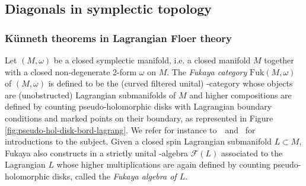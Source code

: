 \documentclass[twoside, 12pt]{amsart}
\theoremstyle{remark}
\begin{document}
\subsection{Diagonals in symplectic topology}

\subsubsection{K\"unneth theorems in Lagrangian Floer theory}

Let $(M,\omega)$ be a closed symplectic manifold, i.e. a closed manifold $M$ together with a closed non-degenerate 2-form $\omega$ on $M$. 
The \emph{Fukaya category} $\mathrm{Fuk}(M,\omega)$ of $(M,\omega)$  is defined to be the (curved filtered unital) \Ainf -category whose objects are (unobstructed) Lagrangian submanifolds of $M$ and higher compositions are defined by counting pseudo-holomorphic disks with Lagrangian boundary conditions and marked points on their boundary, as represented in Figure \ref{fig:pseudo-hol-disk-bord-lagrang}. 
We refer for instance to~\cite{smith-prolegomenon}~and~\cite{auroux-fukaya} for introductions to the subject.
Given a closed spin Lagrangian submanifold $L \subset M$, Fukaya also constructs in \cite{fukaya-cyclic-symmetry} a strictly unital \Ainf -algebra $\mathcal{F}(L)$ associated to the Lagrangian $L$ whose higher multiplications are again defined by counting pseudo-holomorphic disks, called the \emph{Fukaya algebra of $L$}. 
\end{document}
